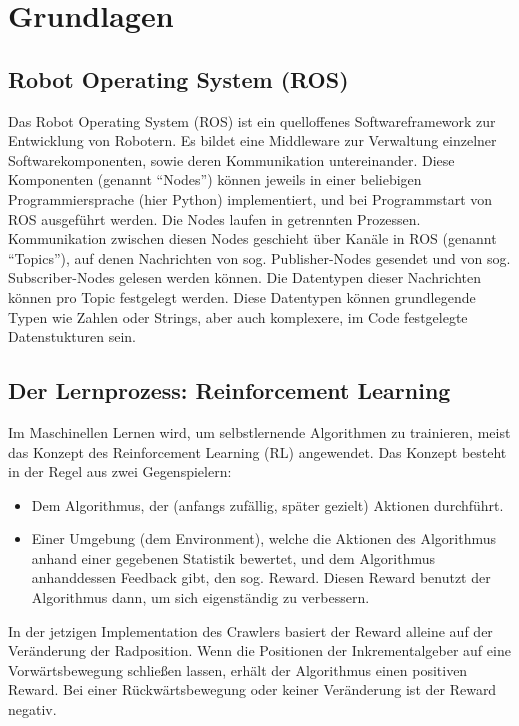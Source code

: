 \section{Grundlagen}


\subsection{Robot Operating System (ROS)}

Das Robot Operating System (ROS)\cite{ros} ist ein quelloffenes Softwareframework zur Entwicklung von Robotern. Es bildet eine Middleware zur Verwaltung einzelner Softwarekomponenten, sowie deren Kommunikation untereinander. Diese Komponenten (genannt ``Nodes'') können jeweils in einer beliebigen Programmiersprache (hier Python) implementiert, und bei Programmstart von ROS ausgeführt werden. Die Nodes laufen in getrennten Prozessen. Kommunikation zwischen diesen Nodes geschieht über Kanäle in ROS (genannt ``Topics''), auf denen Nachrichten von sog. Publisher-Nodes gesendet und von sog. Subscriber-Nodes gelesen werden können. Die Datentypen dieser Nachrichten können pro Topic festgelegt werden. Diese Datentypen können grundlegende Typen wie Zahlen oder Strings, aber auch komplexere, im Code festgelegte Datenstukturen sein.

\subsection{Der Lernprozess: Reinforcement Learning}

Im Maschinellen Lernen wird, um selbstlernende Algorithmen zu trainieren, meist das Konzept des Reinforcement Learning (RL) angewendet. Das Konzept besteht in der Regel aus zwei Gegenspielern:
\begin{itemize}
    \item Dem Algorithmus, der (anfangs zufällig, später gezielt) Aktionen durchführt.
    \item Einer Umgebung (dem Environment), welche die Aktionen des Algorithmus anhand einer gegebenen Statistik bewertet, und dem Algorithmus anhanddessen Feedback gibt, den sog. Reward. Diesen Reward benutzt der Algorithmus dann, um sich eigenständig zu verbessern.
\end{itemize}

In der jetzigen Implementation des Crawlers basiert der Reward alleine auf der Veränderung der Radposition. Wenn die Positionen der Inkrementalgeber auf eine Vorwärtsbewegung schließen lassen, erhält der Algorithmus einen positiven Reward. Bei einer Rückwärtsbewegung oder keiner Veränderung ist der Reward negativ.

